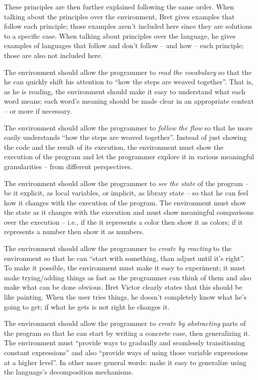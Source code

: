 \documentclass{./llncs2e/llncs}
\begin{document}
These principles are then further explained following the same order. When talking about the principles over the environment, Bret gives examples that follow each principle; those examples aren't included here since they are solutions to a specific case. When talking about principles over the language, he gives examples of languages that follow and don't follow -- and how -- each principle; those are also not included here.

The environment should allow the programmer to \emph{read the vocabulary} so that the he can quickly shift his attention to ``how the steps are weaved together''. That is, as he is reading, the environment should make it easy to understand what each word means; each word's meaning should be made clear in an appropriate context -- or more if necessary.

The environment should allow the programmer to \emph{follow the flow} so that he more easily understands ``how the steps are weaved together''. Instead of just showing the code and the result of its execution, the environment must show the execution of the program and let the programmer explore it in various meaningful granularities -- from different perspectives.

The environment should allow the programmer to \emph{see the state} of the program -- be it explicit, as local variables, or implicit, as library state -- so that he can feel how it changes with the execution of the program. The environment must show the state as it changes with the execution and must show meaningful comparisons over the execution -- i.e., if the it represents a color then show it as colors; if it represents a number then show it as numbers.

The environment should allow the programmer to \emph{create by reacting} to the environment so that he can ``start with something, than adjust until it's right''. To make it possible, the environment must make it easy to experiment; it must make trying/adding things as fast as the programmer can think of them and also make what can be done obvious. Bret Victor clearly states that this should be like painting. When the user tries things, he doesn't completely know what he's going to get; if what he gets is not right he changes it.

The environment should allow the programmer to \emph{create by abstracting} parts of the program so that he can start by writing a concrete case, then generalizing it. The environment must ``provide ways to gradually and seamlessly transitioning constant expressions'' and also ``provide ways of using those variable expressions at a higher level''. In other more general words: make it easy to generalize using the language's decomposition mechanisms. 
\end{document}

